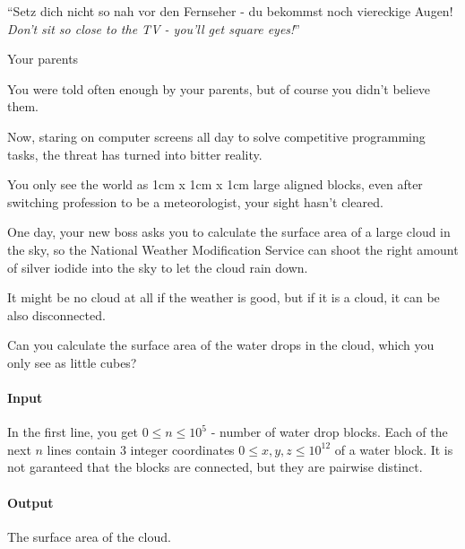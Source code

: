 

\usepackage{epigraph}



\makeheader

\epigraph{``Setz dich nicht so nah vor den Fernseher - du bekommst noch
  viereckige Augen!\\ \textit{Don't sit so close to the TV - you'll get square
    eyes!}''}{Your parents}

You were told often enough by your parents, but of course you didn't believe them.

Now, staring on computer screens all day to solve competitive programming tasks, the threat has turned into bitter reality.

You only see the world as 1cm x 1cm x 1cm large aligned blocks, even after switching profession to be a meteorologist, your sight hasn't cleared.

One day, your new boss asks you to calculate the surface area of a large cloud in the sky, so the National Weather Modification Service can shoot the right amount of silver iodide into the sky to let the cloud rain down.

It might be no cloud at all if the weather is good, but if it is a cloud, it can be also disconnected.

Can you calculate the surface area of the water drops in the cloud, which you only see as little cubes?

\paragraph*{Input}

In the first line, you get $0 \leq n \leq 10^5$ - number of water drop blocks.
Each of the next $n$ lines contain 3 integer coordinates $0 \leq x, y, z \leq 10^{12}$ of a water block. It is not garanteed that the blocks are connected, but they are pairwise distinct.

\paragraph*{Output}

The surface area of the cloud.

\begin{samples}
\end{samples}

